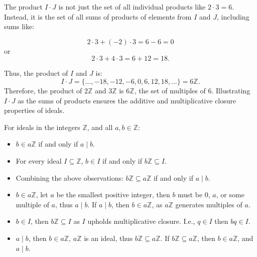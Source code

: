 \noindent
The product $I \cdot J$ is not just the set of all individual products like $2 \cdot 3 = 6$. Instead, it is the set of all sums of products of elements from $I$ and $J$, including sums like:

\[
    2 \cdot 3 + (-2) \cdot 3 = 6 - 6 = 0
\]
or
\[
    2 \cdot 3 + 4 \cdot 3 = 6 + 12 = 18.
\]

Thus, the product of $I$ and $J$ is:
\[
    I \cdot J = \{ \ldots, -18, -12, -6, 0, 6, 12, 18, \ldots \} = 6\mathbb{Z}.
\]
Therefore, the product of $2\mathbb{Z}$ and $3\mathbb{Z}$ is $6\mathbb{Z}$, the set of multiples of 6.
Illustrating $I \cdot J$ as the sums of products ensures the additive and multiplicative closure properties of ideals.
\newpage

\begin{theo}

    \label{theo:ideal_properties}

    For ideals in the integers $\mathbb{Z}$, and all $a, b \in \mathbb{Z}$:
    \begin{itemize}
        \item $b \in a\mathbb{Z}$ if and only if $a \mid b$.
        \item For every ideal $I \subseteq \mathbb{Z}$, $b \in I$ if and only if $b\mathbb{Z} \subseteq I$.
        \item Combining the above observations: $b\mathbb{Z} \subseteq a\mathbb{Z}$ if and only if $a \mid b$.
    \end{itemize}
\end{theo}

\begin{Proof}

    \begin{itemize}
        \item $b \in a\mathbb{Z}$, let $a$ be the smallest positive integer, then $b$ must be 0, $a$, or some
        multiple of $a$, thus $a \mid b$. If $a\mid b$, then $b\in a\mathbb{Z}$, as $a\mathbb{Z}$ generates multiples of $a$.
        \item $b \in I$, then $b\mathbb{Z} \subseteq I$ as $I$ upholds multiplicative closure. I.e., $q\in I$ then $bq\in I$.
        \item $a\mid b$, then $b\in a\mathbb{Z}$, $a\mathbb{Z}$ is an ideal, thus $b\mathbb{Z} \subseteq a\mathbb{Z}$. If $b\mathbb{Z} \subseteq a\mathbb{Z}$, then $b\in a\mathbb{Z}$, and $a\mid b$.
    \end{itemize}
\end{Proof}


